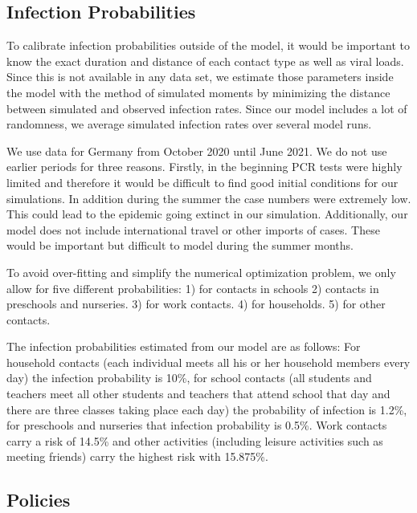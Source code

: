 \subsection{Infection Probabilities}
\label{subsec:infection_probs}


To calibrate infection probabilities outside of the model, it would be important to know
the exact duration and distance of each contact type as well as viral loads. Since this
is not available in any data set, we estimate those parameters inside the model with the
method of simulated moments \citep{McFadden1989} by minimizing the distance between
simulated and observed infection rates. Since our model includes a lot of randomness, we
average simulated infection rates over several model runs.

We use data for Germany from October 2020 until June 2021. We do not use
earlier periods for three reasons. Firstly, in the beginning PCR tests were highly
limited and therefore it would be difficult to find good initial conditions for our
simulations. In addition during the summer the case numbers were extremely low. This
could lead to the epidemic going extinct in our simulation. Additionally, our model does
not include international travel or other imports of cases. These would be important but
difficult to model during the summer months.

To avoid over-fitting and simplify the numerical optimization problem, we only allow for
five different probabilities: 1) for contacts in schools 2) contacts in preschools and
nurseries. 3) for work contacts. 4) for households. 5) for other contacts.

The infection probabilities estimated from our model are as follows: For household
contacts (each individual meets all his or her household members every day) the infection
probability is 10\%, for school contacts (all students and teachers meet all other
students and teachers that attend school that day and there are three classes taking
place each day) the probability of infection is 1.2\%, for preschools and nurseries that
infection probability is 0.5\%. Work contacts carry a risk of 14.5\% and other activities
(including leisure activities such as meeting friends) carry the highest risk with
15.875\%.

\subsection{Policies}
\label{subsec:policies}

